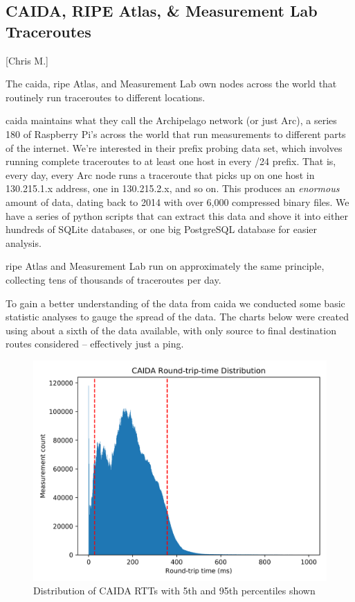\documentclass[12pt]{article}
\begin{document}
\subsection{CAIDA, RIPE Atlas, \& Measurement Lab Traceroutes}[Chris M.]

The \acrfull{caida}, \acrfull{ripe} Atlas, and Measurement Lab own nodes across the world that routinely run traceroutes to different locations. 

\acrshort{caida} maintains what they call the Archipelago network (or just Arc), a series \textapprox{}180 of Raspberry Pi's across the world that run measurements to different parts of the internet. We're interested in their prefix probing data set, which involves running complete traceroutes to at least one host in every /24 prefix. That is, every day, every Arc node runs a traceroute that picks up on one host in 130.215.1.x address, one in 130.215.2.x, and so on. This produces an \textit{enormous} amount of data, dating back to 2014 with over 6,000 compressed binary files. We have a series of python scripts that can extract this data and shove it into either hundreds of SQLite databases, or one big PostgreSQL database for easier analysis.

\acrshort{ripe} Atlas and Measurement Lab run on approximately the same principle, collecting tens of thousands of traceroutes per day.

To gain a better understanding of the data from \acrshort{caida} we conducted some basic statistic analyses to gauge the spread of the data. The charts below were created using about a sixth of the data available, with only source to final destination routes considered -- effectively just a ping.

\begin{figure}[H]
    \centering
    \includegraphics[width=\textwidth]{images/CAIDA_rtt_dist.png}
    \caption{Distribution of CAIDA RTTs with 5th and 95th percentiles shown}
    \label{fig:rtt_dist}
\end{figure}
\end{document}
